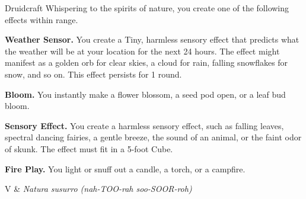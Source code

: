 \begin{Spell}[
  level=Cantrip,
  time=1 Action,
  range=30 ft,
  components={V, S},
  duration=Instantaneous,
  school=Transmutation,
  attack=None,
  effect=Utility
]{Druidcraft}
Whispering to the spirits of nature, you create one of the following effects within range.

\textbf{Weather Sensor.} You create a Tiny, harmless sensory effect that predicts what the weather will be at your location for the next 24 hours. The effect might manifest as a golden orb for clear skies, a cloud for rain, falling snowflakes for snow, and so on. This effect persists for 1 round.

\textbf{Bloom.} You instantly make a flower blossom, a seed pod open, or a leaf bud bloom.

\textbf{Sensory Effect.} You create a harmless sensory effect, such as falling leaves, spectral dancing fairies, a gentle breeze, the sound of an animal, or the faint odor of skunk. The effect must fit in a 5-foot Cube.

\textbf{Fire Play.} You light or snuff out a candle, a torch, or a campfire.

\begin{components}
V & \textit{Natura susurro (nah-TOO-rah soo-SOOR-roh)}
\end{components}
\end{Spell}


